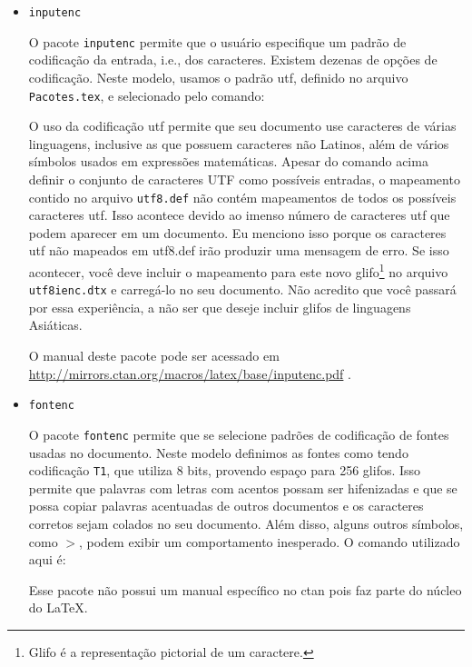 \begin{itemize}
	\item \texttt{inputenc}
	
O pacote \texttt{inputenc} permite que o usuário especifique um padrão de codificação da entrada, i.e., dos caracteres. Existem dezenas de opções de codificação. Neste modelo, usamos o padrão \gls{utf}, definido no arquivo \texttt{Pacotes.tex}, e selecionado pelo comando: 


O uso da codificação \gls{utf} permite que seu documento use caracteres de várias linguagens, inclusive as que possuem caracteres não Latinos, além de vários símbolos usados em expressões matemáticas. Apesar do comando acima definir o conjunto de caracteres UTF como possíveis entradas, o mapeamento contido no arquivo \texttt{utf8.def} não contém mapeamentos de todos os possíveis caracteres \gls{utf}. Isso acontece devido ao imenso número de caracteres \gls{utf} que podem aparecer em um documento. Eu menciono isso porque os caracteres \gls{utf} não mapeados em utf8.def irão produzir uma mensagem de erro. Se isso acontecer, você deve incluir o mapeamento para este novo glifo\footnote{Glifo é a representação pictorial de um caractere.} no arquivo \texttt{utf8ienc.dtx} e carregá-lo no seu documento. Não acredito que você passará por essa experiência, a não ser que deseje incluir glifos de linguagens Asiáticas. 

O manual deste pacote pode ser acessado em 
\url{http://mirrors.ctan.org/macros/latex/base/inputenc.pdf} \parencite{inputenc}.

\item \texttt{fontenc}

O pacote \texttt{fontenc} permite que se selecione padrões de codificação de fontes usadas no documento. Neste modelo definimos as fontes como tendo codificação \texttt{T1}, que utiliza 8 bits, provendo espaço para 256 glifos. Isso permite que palavras com letras com acentos possam ser hifenizadas e que se possa copiar palavras acentuadas de outros documentos e os caracteres corretos sejam colados no seu documento. Além disso, alguns outros símbolos, como $>$, podem exibir um comportamento inesperado. O comando utilizado aqui é:


Esse pacote não possui um manual específico no \gls{ctan} pois faz parte do núcleo do \LaTeX{}.


\end{itemize}

